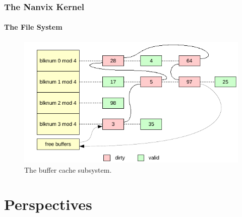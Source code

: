 \documentclass{beamer}
\begin{document}
		\begin{frame}
		\frametitle{The Nanvix Kernel}
		\framesubtitle{The File System}
			\begin{figure}
				\centering
				\includegraphics[width=\linewidth]{buffer-cache}
				\caption{The buffer cache subsystem.}
			\end{figure}
		\end{frame}

\section{Perspectives}
\end{document}
